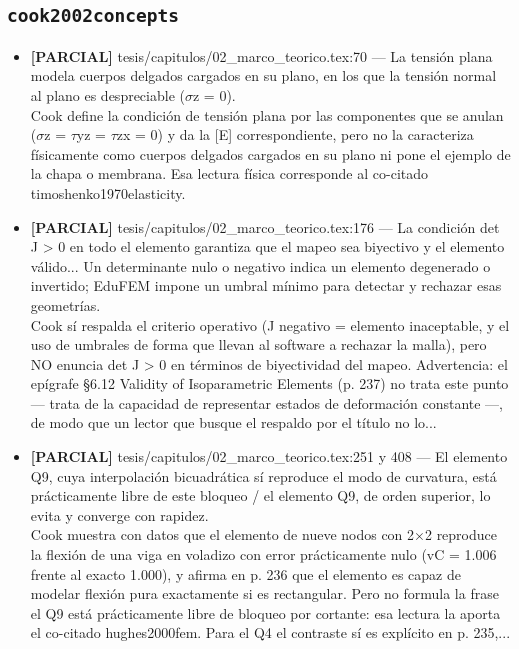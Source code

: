 \documentclass[11pt,a4paper]{article}
\newcommand{\campo}[1]{\textcolor{gris}{\footnotesize #1}}
\begin{document}
\subsection{\texttt{cook2002concepts}}
\begin{itemize}\small
\item \textbf{[PARCIAL]} tesis/capitulos/02\_marco\_teorico.tex:70 --- \textquotedbl{}La tensión plana modela cuerpos delgados cargados en su plano, en los que la tensión normal al plano es despreciable ($\sigma$z = 0)\textquotedbl{}.
\\ \campo{Cook define la condición de tensión plana por las componentes que se anulan ($\sigma$z = $\tau$yz = $\tau$zx = 0) y da la [E] correspondiente, pero no la caracteriza físicamente como \textquotedbl{}cuerpos delgados cargados en su plano\textquotedbl{} ni pone el ejemplo de la chapa o membrana. Esa lectura física corresponde al co-citado timoshenko1970elasticity.}
\item \textbf{[PARCIAL]} tesis/capitulos/02\_marco\_teorico.tex:176 --- \textquotedbl{}La condición det J \textgreater{} 0 en todo el elemento garantiza que el mapeo sea biyectivo y el elemento válido... Un determinante nulo o negativo indica un elemento degenerado o invertido; EduFEM impone un umbral mínimo para detectar y rechazar esas geometrías\textquotedbl{}.
\\ \campo{Cook sí respalda el criterio operativo (J negativo = elemento inaceptable, y el uso de umbrales de forma que llevan al software a rechazar la malla), pero NO enuncia det J \textgreater{} 0 en términos de biyectividad del mapeo. Advertencia: el epígrafe §6.12 \textquotedbl{}Validity of Isoparametric Elements\textquotedbl{} (p. 237) no trata este punto --- trata de la capacidad de representar estados de deformación constante ---, de modo que un lector que busque el respaldo por el título no lo...}
\item \textbf{[PARCIAL]} tesis/capitulos/02\_marco\_teorico.tex:251 y 408 --- \textquotedbl{}El elemento Q9, cuya interpolación bicuadrática sí reproduce el modo de curvatura, está prácticamente libre de este bloqueo\textquotedbl{} / \textquotedbl{}el elemento Q9, de orden superior, lo evita y converge con rapidez\textquotedbl{}.
\\ \campo{Cook muestra con datos que el elemento de nueve nodos con 2$\times$2 reproduce la flexión de una viga en voladizo con error prácticamente nulo (vC = 1.006 frente al exacto 1.000), y afirma en p. 236 que el elemento es capaz de modelar flexión pura exactamente si es rectangular. Pero no formula la frase \textquotedbl{}el Q9 está prácticamente libre de bloqueo por cortante\textquotedbl{}: esa lectura la aporta el co-citado hughes2000fem. Para el Q4 el contraste sí es explícito en p. 235,...}

\end{itemize}
\end{document}
